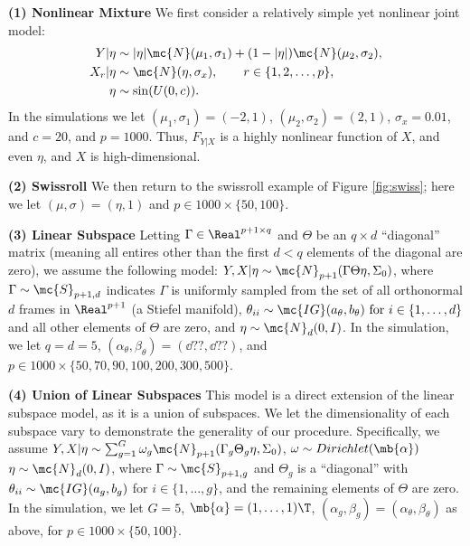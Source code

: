 \textbf{(1) Nonlinear Mixture}
%
We first consider a relatively simple yet nonlinear joint model:
\begin{subequations}
\begin{align}
	Y|\eta &\sim   |\eta| \mc{N}(\mu_1,\sigma_1) + (1-|\eta|) \mc{N}(\mu_2,\sigma_2), \\
	X_r|\eta  &\sim \mc{N}(\eta, \sigma_x), \qquad r \in \{1, 2, \ldots, p\}, \\
	\eta  &\sim \sin(U(0,c)). %
\end{align}
\end{subequations}
In the simulations we let $(\mu_1,\sigma_1)=(-2,1)$, $(\mu_2,\sigma_2)=(2,1)$, $\sigma_x=0.01$, and $c=20$, and $p=1000$. Thus, $F_{Y|X}$ is a highly nonlinear function of $X$, and even $\eta$, and $X$ is high-dimensional.  

\textbf{(2) Swissroll} 
% 
We then return to the swissroll example of Figure \ref{fig:swiss}; here we let $(\mu,\sigma)=(\eta,1)$ and   $p \in 1000 \times \{50, 100\}$.

\textbf{(3) Linear Subspace} Letting $\Gamma \in \Real^{p+1 \times q}$ and $\Theta$ be an ${q \times d}$ ``diagonal'' matrix (meaning all entires other than the first $d < q$ elements of the diagonal are zero), we assume the following model:
	$Y,X |\eta \sim \mc{N}_{p+1}(\Gamma \Theta \eta ,\Sigma_0)$,
	where 	$\Gamma \sim \mc{S}_{p+1,d}$ indicates $\Gamma$ is uniformly sampled from the set of all orthonormal $d$ frames in $\Real^{p+1}$ (a Stiefel manifold), 
	$\theta_{ii} \sim \mc{IG}(a_\theta,b_\theta) \text{ for } i \in \{1, \ldots, d\}$ and all other elements of $\Theta$ are zero, and $\eta  \sim \mc{N}_d(0, I)$.  In the simulation, we let $q=d=5$,   $(\alpha_\theta,\beta_\theta)=(\dd{??},\dd{??})$, and $p \in 1000 \times \{50, 70, 90, 100, 200, 300, 500\}$.


\textbf{(4) Union of Linear Subspaces}
This model is a direct extension of the linear subspace model, as it is a union of subspaces. We let the dimensionality of each subspace vary to demonstrate the generality of our procedure.  Specifically, we assume 	$Y,X |\eta \sim \sum_{g=1}^G \omega_g \mc{N}_{p+1}(\Gamma_g \Theta_g \eta ,\Sigma_0)$, $\omega \sim Dirichlet(\mb{\alpha})$ 
	$\eta \sim \mc{N}_d(0, I)$, 
where $\Gamma \sim \mc{S}_{p+1,g}$ and $\Theta_g$ is a ``diagonal'' with $\theta_{ii} \sim \mc{IG}(a_g,b_g)$ for  $i \in \{1, \ldots, g\}$, and the remaining elements of $\Theta$ are zero.
In the simulation, we let $G=5$,  $\mb{\alpha}=(1, \ldots, 1)\T$,  $(\alpha_g,\beta_g)=(\alpha_\theta,\beta_\theta)$ as above, for  $p \in 1000 \times \{50, 100\}$.
  
